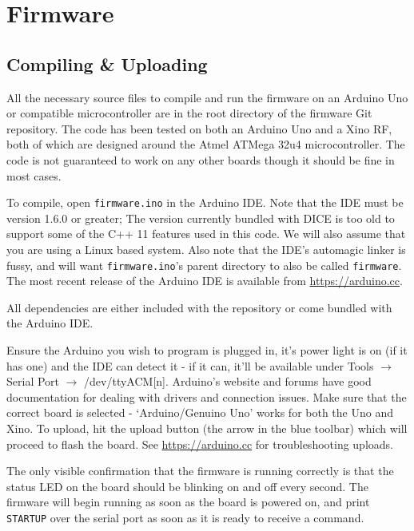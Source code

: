 %
%

\section{Firmware}

\subsection{Compiling \& Uploading}

All the necessary source files to compile and run the firmware on an Arduino Uno or compatible microcontroller are in the root directory of the firmware Git repository. The code has been tested on both an Arduino Uno and a Xino RF, both of which are designed around the Atmel ATMega 32u4 microcontroller. The code is not guaranteed to work on any other boards though it should be fine in most cases.

To compile, open \texttt{firmware.ino} in the Arduino IDE. Note that the IDE must be version 1.6.0 or greater; The version currently bundled with DICE is too old to support some of the C++ 11 features used in this code. We will also assume that you are using a Linux based system. Also note that the IDE's automagic linker is fussy, and will want \texttt{firmware.ino}'s parent directory to also be called \texttt{firmware}. The most recent release of the Arduino IDE is available from \href{https://arduino.cc}{https://arduino.cc}.

All dependencies are either included with the repository or come bundled with the Arduino IDE.

Ensure the Arduino you wish to program is plugged in, it's power light is on (if it has one) and the IDE can detect it - if it can, it'll be available under Tools $\rightarrow$ Serial Port $\rightarrow$ /dev/ttyACM[n]. Arduino's website and forums have good documentation for dealing with drivers and connection issues. Make sure that the correct board is selected - `Arduino/Genuino Uno' works for both the Uno and Xino. To upload, hit the upload button (the arrow in the blue toolbar) which will proceed to flash the board. See \href{https://www.arduino.cc/en/Guide/Troubleshooting}{https://arduino.cc} for troubleshooting uploads.

The only visible confirmation that the firmware is running correctly is that the status LED on the board should be blinking on and off every second. The firmware will begin running as soon as the board is powered on, and print \verb|STARTUP| over the serial port as soon as it is ready to receive a command.

